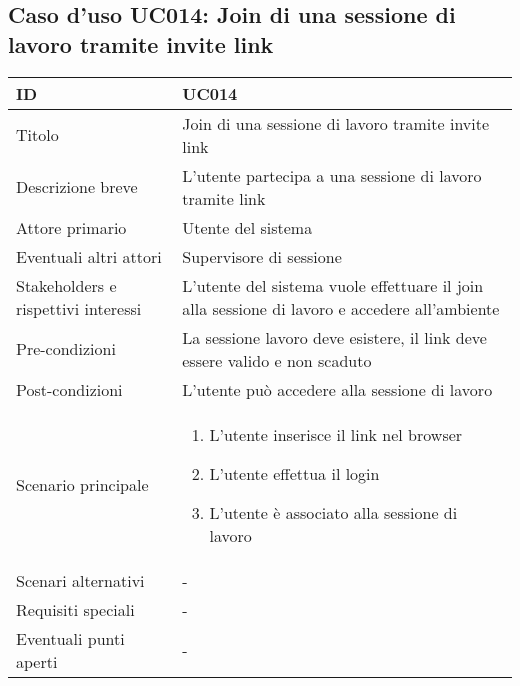 \documentclass[../../main.tex]{subfiles}
\begin{document}
\subsection{Caso d’uso UC014: Join di una sessione di lavoro tramite invite link }
\begin{tabularx}{150mm}{|l|X|}
    \hline
    ID                                  & \textbf{UC014}\\
    \hline
    Titolo                              & Join di una sessione di lavoro tramite invite link \\
    \hline
    Descrizione breve                   & L'utente partecipa a una sessione di lavoro tramite link  \\
    \hline
    Attore primario                     & Utente del sistema   \\
    \hline
    Eventuali altri attori              & Supervisore di sessione   \\
    \hline
    Stakeholders e rispettivi interessi & L'utente del sistema vuole effettuare il join alla sessione di lavoro e accedere all'ambiente  \\
    \hline
    Pre-condizioni                      & La sessione lavoro deve esistere, il link deve essere valido e non scaduto  \\
    \hline
    Post-condizioni                     & L'utente può accedere alla sessione di lavoro   \\
    \hline
    Scenario principale                 &
    \begin{enumerate}
        \item L'utente inserisce il link nel browser
        \item L'utente effettua il login
        \item L'utente è associato alla sessione di lavoro 
    \end{enumerate} \\
            \hline
    Scenari alternativi                 & -   \\
    \hline
    Requisiti speciali                  & -   \\
    \hline
    Eventuali punti aperti              & -   \\
    \hline
\end{tabularx}
\newpage
\end{document}

